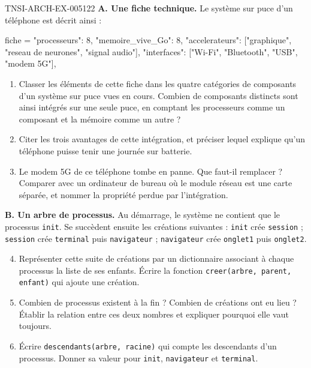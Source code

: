 \begin{exercice}{TNSI-ARCH-EX-005}{1}{22}
\textbf{A. Une fiche technique.} Le système sur puce d'un téléphone est décrit
ainsi :
\begin{python}
fiche = {
    "processeurs": 8,
    "memoire_vive_Go": 8,
    "accelerateurs": ["graphique", "reseau de neurones", "signal audio"],
    "interfaces": ["Wi-Fi", "Bluetooth", "USB", "modem 5G"],
}
\end{python}
\begin{enumerate}
  \item Classer les éléments de cette fiche dans les quatre catégories de
    composants d'un système sur puce vues en cours. Combien de composants
    distincts sont ainsi intégrés sur une seule puce, en comptant les
    processeurs comme un composant et la mémoire comme un autre ?
  \item Citer les trois avantages de cette intégration, et préciser lequel
    explique qu'un téléphone puisse tenir une journée sur batterie.
  \item Le modem 5G de ce téléphone tombe en panne. Que faut-il remplacer ?
    Comparer avec un ordinateur de bureau où le module réseau est une carte
    séparée, et nommer la propriété perdue par l'intégration.
\end{enumerate}

\medskip
\textbf{B. Un arbre de processus.} Au démarrage, le système ne contient que le
processus \lstinline{init}. Se succèdent ensuite les créations suivantes :
\lstinline{init} crée \lstinline{session} ; \lstinline{session} crée
\lstinline{terminal} puis \lstinline{navigateur} ; \lstinline{navigateur} crée
\lstinline{onglet1} puis \lstinline{onglet2}.
\begin{enumerate}
  \setcounter{enumi}{3}
  \item Représenter cette suite de créations par un dictionnaire associant à
    chaque processus la liste de ses enfants. Écrire la fonction
    \lstinline{creer(arbre, parent, enfant)} qui ajoute une création.
  \item Combien de processus existent à la fin ? Combien de créations ont eu
    lieu ? Établir la relation entre ces deux nombres et expliquer pourquoi elle
    vaut toujours.
  \item Écrire \lstinline{descendants(arbre, racine)} qui compte les descendants
    d'un processus. Donner sa valeur pour \lstinline{init},
    \lstinline{navigateur} et \lstinline{terminal}.
\end{enumerate}
\end{exercice}
